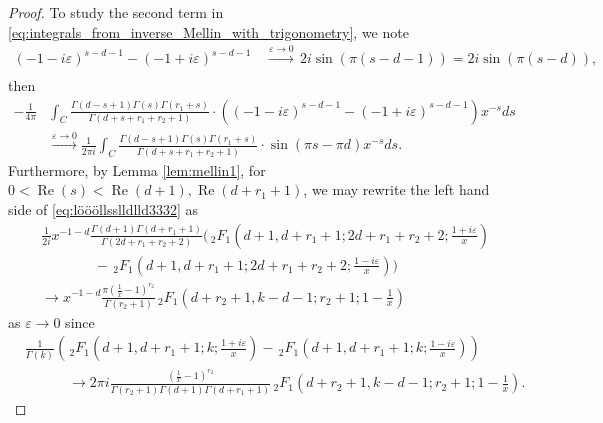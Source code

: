 \documentclass[]{article}
\renewcommand{\Re}{\operatorname{Re}}
\begin{document}
\begin{proof}
To study the second term in  \eqref{eq:integrals_from_inverse_Mellin_with_trigonometry}, we note 
\begin{equation}
\begin{split}
    (-1-i\varepsilon)^{s-d-1}-(-1+i\varepsilon)^{s-d-1} &\, \stackrel{ \varepsilon \to 0 }{\to}\,  2i \sin( \pi (s-d-1) )  = 2i \sin( \pi (s-d) ), \\ 
\end{split}
 \end{equation}  
then 
\begin{equation}\label{eq:löööllsslldlld3332}
\begin{split}
   -\frac{1}{4\pi }&  \int_{C}\frac{   \Gamma(d-s+1)   \Gamma(s) \Gamma(r_1 + s) }{\Gamma (d+s+r_1+r_2+1)  }        \cdot   \left((-1-i\varepsilon)^{s-d-1}-(-1+i\varepsilon)^{s-d-1}\right)   x^{-s}  ds 
    \\ & \stackrel{ \varepsilon \to 0 }{\to}
  \frac{1}{ 2\pi i}  \int_{C}\frac{   \Gamma(d-s+1)   \Gamma(s) \Gamma(r_1 + s) }{\Gamma (d+s+r_1+r_2+1)  }        \cdot   \sin (\pi s - \pi d)    x^{-s}  ds .
\end{split}
\end{equation}
Furthermore, by Lemma \ref{lem:mellin1}, for $0<\Re(s)<\Re(d+1),\Re(d+r_1+1)$,
we may rewrite the left hand side of \eqref{eq:löööllsslldlld3332} as 
\begin{equation}
\begin{split}
      &  \frac{1}{2i} x^{-1-d} \frac{\Gamma (d+1) \Gamma (d+r_1+1)}{  \Gamma(2 d+r_1+r_2+2) }   \big(\,_2 F_1\left(d+1,d+r_1+1;2 d+r_1+r_2+2;\frac{1+i\varepsilon}{x}\right)\\ & \ \ \ \ \ \ \ \ \ \ \ \ \ \ \ \ \ -\,_2 F_1\left(d+1,d+r_1+1;2 d+r_1+r_2+2;\frac{1-i\varepsilon}{x}\right)\big)\\
       & \to  x^{-1-d}     \frac{ \pi (\frac{1}{x}-1)^{r_2}  }{ \Gamma(r_2+1) } \, _2F_1\left(d+r_2+1, k-d-1;r_2+1;1-\frac{1}{x}\right)
\end{split}
\end{equation} as $\varepsilon\to 0$
since 
  \begin{equation}
    \begin{split}
  &     \frac{1}{\Gamma(k)}\left( \, _2 F_1 \left(d+1,d+r_1+1;k;\frac{1+i \varepsilon}{x}\right)  - \, _2 F_1\left(d+1,d+r_1+1;k;\frac{1-i \varepsilon}{x}\right)\right) \\
  &  \ \ \ \ \ \ \  \ \ \ \ \ \ \ \to  2  \pi i \frac{  (\frac{1}{x}-1)^{r_2} }{\Gamma(r_2+1)\Gamma (d+1) \Gamma (d+r_1+1)} \, _2F_1\left(d+r_2+1, k-d-1;r_2+1;1-\frac{1}{x}\right).

\end{split}
\end{equation}
\end{proof}
\end{document}
